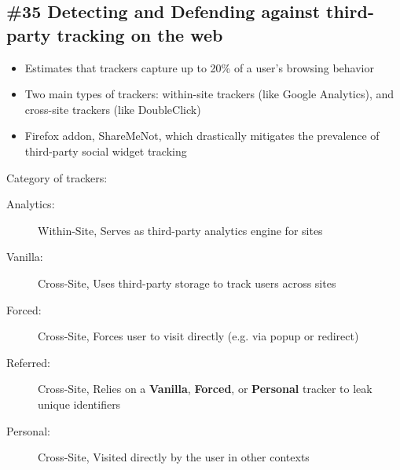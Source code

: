 \subsection{\#35 Detecting and Defending against third-party tracking on the web}
\begin{itemize}
	\item Estimates that trackers capture up to 20\% of a user's browsing behavior
	\item Two main types of trackers: within-site trackers (like Google Analytics), and cross-site trackers (like DoubleClick)
	\item Firefox addon, ShareMeNot, which drastically mitigates the prevalence of third-party social widget tracking
\end{itemize}
Category of trackers:
\begin{description}
	\item[Analytics:] Within-Site, Serves as third-party analytics engine for sites
	\item[Vanilla:] Cross-Site, Uses third-party storage to track users across sites
	\item[Forced:] Cross-Site, Forces user to visit directly (e.g. via popup or redirect)
	\item[Referred:] Cross-Site, Relies on a \textbf{Vanilla}, \textbf{Forced}, or \textbf{Personal} tracker to leak unique identifiers
	\item[Personal:] Cross-Site, Visited directly by the user in other contexts
\end{description}